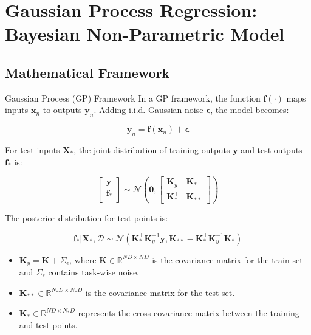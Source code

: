 \section{Gaussian Process Regression: Bayesian Non-Parametric Model}

\subsection{Mathematical Framework}

\begin{frame}{Gaussian Process (GP) Framework}
	In a GP framework, the function $\bm{f}(\cdot)$ maps inputs $\bm{x}_n$ to outputs $\bm{y}_n$. Adding i.i.d. Gaussian noise $\bm{\epsilon}$, the model becomes:
	
	\[
	\bm{y}_n = \bm{f}(\bm{x}_n) + \bm{\epsilon}
	\]
	
	For test inputs $\mathbf{X}_*$, the joint distribution of training outputs $\mathbf{y}$ and test outputs $\mathbf{f}_*$ is:
	
	\[
	\left[ \begin{array}{c}
		\mathbf{y}\\
		\mathbf{f_*}\\
	\end{array}
	\right] \sim \mathcal{N} \left( \bm{0}, \left[
	\begin{array}{cc}
		\mathbf{K}_y & \mathbf{K}_* \\
		\mathbf{K}_*^\top & \mathbf{K}_{**}
	\end{array}\right] \right)
	\]
	
	The posterior distribution for test points is:
	
	\[
	\mathbf{f}_* | \mathbf{X}_*, \mathcal{D} \sim \mathcal{N}(\mathbf{K}_*^\top \mathbf{K}_y^{-1} \mathbf{y}, \mathbf{K}_{**} - \mathbf{K}_*^\top \mathbf{K}_y^{-1} \mathbf{K}_*)
	\]
	
	\begin{itemize}
		\item $\mathbf{K}_y = \mathbf{K} + \Sigma_\epsilon$, where $\mathbf{K} \in \mathbb{R}^{ND \times ND}$ is the covariance matrix for the train set and $\Sigma_\epsilon$ contains task-wise noise.
		
		\item $\mathbf{K}_{**} \in \mathbb{R}^{N_* D \times N_* D}$ is the covariance matrix for the test set.
		
		\item $\mathbf{K}_* \in \mathbb{R}^{ND \times N_* D}$ represents the cross-covariance matrix between the training and test points.
	\end{itemize}
	
\end{frame}


